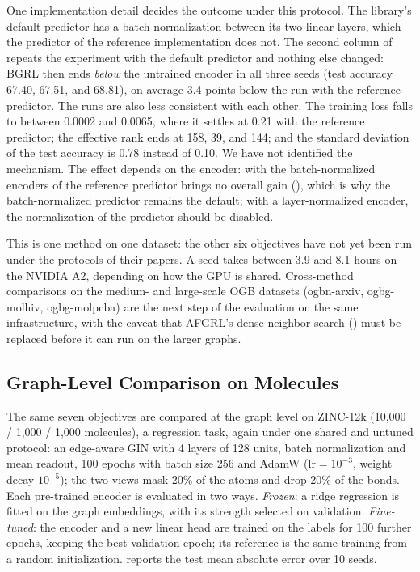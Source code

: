 \documentclass[conference]{IEEEtran}
\begin{document}
One implementation detail decides the outcome under this protocol. The library's default predictor has a batch normalization between its two linear layers, which the predictor of the reference implementation does not. The second column of  repeats the experiment with the default predictor and nothing else changed: BGRL then ends \textit{below} the untrained encoder in all three seeds (test accuracy 67.40, 67.51, and 68.81), on average 3.4 points below the run with the reference predictor. The runs are also less consistent with each other. The training loss falls to between 0.0002 and 0.0065, where it settles at 0.21 with the reference predictor; the effective rank ends at 158, 39, and 144; and the standard deviation of the test accuracy is 0.78 instead of 0.10. We have not identified the mechanism. The effect depends on the encoder: with the batch-normalized encoders of  the reference predictor brings no overall gain (), which is why the batch-normalized predictor remains the default; with a layer-normalized encoder, the normalization of the predictor should be disabled.

This is one method on one dataset: the other six objectives have not yet been run under the protocols of their papers. A seed takes between 3.9 and 8.1 hours on the NVIDIA A2, depending on how the GPU is shared. Cross-method comparisons on the medium- and large-scale OGB datasets (ogbn-arxiv, ogbg-molhiv, ogbg-molpcba) are the next step of the evaluation on the same infrastructure, with the caveat that AFGRL's dense neighbor search () must be replaced before it can run on the larger graphs.

\subsection{Graph-Level Comparison on Molecules}
\label{sec:results-zinc}
The same seven objectives are compared at the graph level on ZINC-12k (10{,}000 / 1{,}000 / 1{,}000 molecules), a regression task, again under one shared and untuned protocol: an edge-aware GIN with 4 layers of 128 units, batch normalization and mean readout, 100 epochs with batch size 256 and AdamW ($\text{lr}{=}10^{-3}$, weight decay $10^{-5}$); the two views mask 20\% of the atoms and drop 20\% of the bonds. Each pre-trained encoder is evaluated in two ways. \textit{Frozen}: a ridge regression is fitted on the graph embeddings, with its strength selected on validation. \textit{Fine-tuned}: the encoder and a new linear head are trained on the labels for 100 further epochs, keeping the best-validation epoch; its reference is the same training from a random initialization.  reports the test mean absolute error over 10 seeds.
\end{document}
